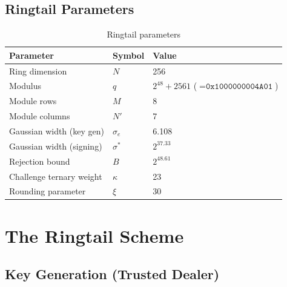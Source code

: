 \documentclass[11pt,a4paper]{article}
\begin{document}
\subsection{Ringtail Parameters}

\begin{table}[h]
\centering
\begin{tabular}{@{}lll@{}}
\toprule
\textbf{Parameter} & \textbf{Symbol} & \textbf{Value} \\
\midrule
Ring dimension & $N$ & 256 \\
Modulus & $q$ & $2^{48} + 2561$ ($= \texttt{0x1000000004A01}$) \\
Module rows & $M$ & 8 \\
Module columns & $N'$ & 7 \\
Gaussian width (key gen) & $\sigma_e$ & 6.108 \\
Gaussian width (signing) & $\sigma^*$ & $2^{37.33}$ \\
Rejection bound & $B$ & $2^{48.61}$ \\
Challenge ternary weight & $\kappa$ & 23 \\
Rounding parameter & $\xi$ & 30 \\
\bottomrule
\end{tabular}
\caption{Ringtail parameters}
\label{tab:params}
\end{table}

\section{The Ringtail Scheme}
\label{sec:scheme}

\subsection{Key Generation (Trusted Dealer)}
\end{document}

